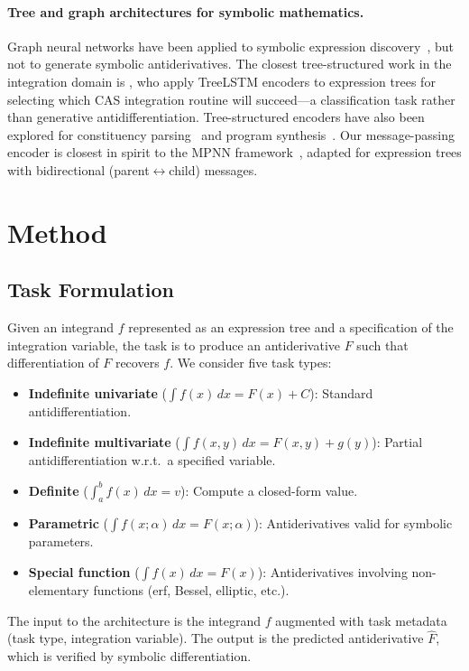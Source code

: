 \documentclass{article}
\begin{document}
\paragraph{Tree and graph architectures for symbolic mathematics.}
Graph neural networks have been applied to symbolic expression
discovery~\citep{cranmer2020discovering,biggio2021neural}, but not to
generate symbolic antiderivatives. The closest tree-structured work in
the integration domain is \citet{barket2024treelstm}, who apply TreeLSTM
encoders to expression trees for selecting which CAS integration routine
will succeed---a classification task rather than generative
antidifferentiation. Tree-structured encoders have also been explored for
constituency parsing~\citep{shiv2019novel} and program
synthesis~\citep{chen2021evaluating}. Our message-passing encoder is
closest in spirit to the MPNN framework~\citep{gilmer2017neural}, adapted
for expression trees with bidirectional (parent$\leftrightarrow$child)
messages.


\section{Method}
\label{sec:method}

\subsection{Task Formulation}
\label{sec:task}

Given an integrand $f$ represented as an expression tree and a
specification of the integration variable, the task is to produce an
antiderivative $F$ such that differentiation of $F$ recovers $f$. We
consider five task types:
\begin{itemize}
	\item \textbf{Indefinite univariate} ($\int f(x)\,dx = F(x) + C$):
	      Standard antidifferentiation.
	\item \textbf{Indefinite multivariate}
	      ($\int f(x,y)\,dx = F(x,y) + g(y)$): Partial antidifferentiation
	      w.r.t.\ a specified variable.
	\item \textbf{Definite} ($\int_a^b f(x)\,dx = v$): Compute a closed-form
	      value.
	\item \textbf{Parametric} ($\int f(x; \alpha)\,dx = F(x; \alpha)$):
	      Antiderivatives valid for symbolic parameters.
	\item \textbf{Special function} ($\int f(x)\,dx = F(x)$): Antiderivatives
	      involving non-elementary functions (erf, Bessel, elliptic, etc.).
\end{itemize}
The input to the architecture is the integrand $f$ augmented with task
metadata (task type, integration variable). The output is the predicted
antiderivative $\hat{F}$, which is verified by symbolic differentiation.
\end{document}
